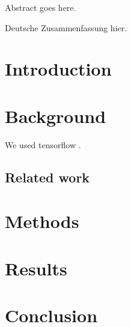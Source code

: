 \documentclass{include/thesisclass}
\begin{document}





Abstract goes here.

Deutsche Zusammenfassung hier.

\chapter{Introduction}

\chapter{Background}
We used tensorflow \cite{abadiTensorFlowLargeScaleMachine2015}.

\section{Related work}

\chapter{Methods}

\chapter{Results}

\chapter{Conclusion}

\Appendix


\TheBibliography
\printbibliography[heading=bibintoc]
\end{document}

